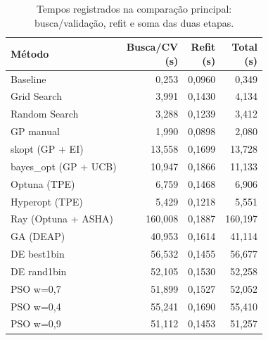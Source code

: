 \documentclass[12pt,a4paper]{article}
\begin{document}
\begin{table}[H]
\centering
\caption{Tempos registrados na comparação principal: busca/validação, refit e soma das duas etapas.}
\small
\setlength{\tabcolsep}{4.5pt}
\renewcommand{\arraystretch}{1.16}
\begin{adjustbox}{max width=\linewidth}
\begin{tabular}{@{}lrrr@{}}
\toprule
Método & \shortstack[r]{Busca/CV\\(s)} & \shortstack[r]{Refit\\(s)} & \shortstack[r]{Total\\(s)} \\
\midrule
Baseline & 0{,}253 & 0{,}0960 & 0{,}349 \\
Grid Search & 3{,}991 & 0{,}1430 & 4{,}134 \\
Random Search & 3{,}288 & 0{,}1239 & 3{,}412 \\
GP manual & 1{,}990 & 0{,}0898 & 2{,}080 \\
skopt (GP + EI) & 13{,}558 & 0{,}1699 & 13{,}728 \\
\addlinespace[3pt]
bayes\_opt (GP + UCB) & 10{,}947 & 0{,}1866 & 11{,}133 \\
Optuna (TPE) & 6{,}759 & 0{,}1468 & 6{,}906 \\
Hyperopt (TPE) & 5{,}429 & 0{,}1218 & 5{,}551 \\
Ray (Optuna + ASHA) & 160{,}008 & 0{,}1887 & 160{,}197 \\
GA (DEAP) & 40{,}953 & 0{,}1614 & 41{,}114 \\
\addlinespace[3pt]
DE best1bin & 56{,}532 & 0{,}1455 & 56{,}677 \\
DE rand1bin & 52{,}105 & 0{,}1530 & 52{,}258 \\
PSO w=0,7 & 51{,}899 & 0{,}1527 & 52{,}052 \\
PSO w=0,4 & 55{,}241 & 0{,}1690 & 55{,}410 \\
PSO w=0,9 & 51{,}112 & 0{,}1453 & 51{,}257 \\
\bottomrule
\end{tabular}
\end{adjustbox}
\end{table}
\end{document}
